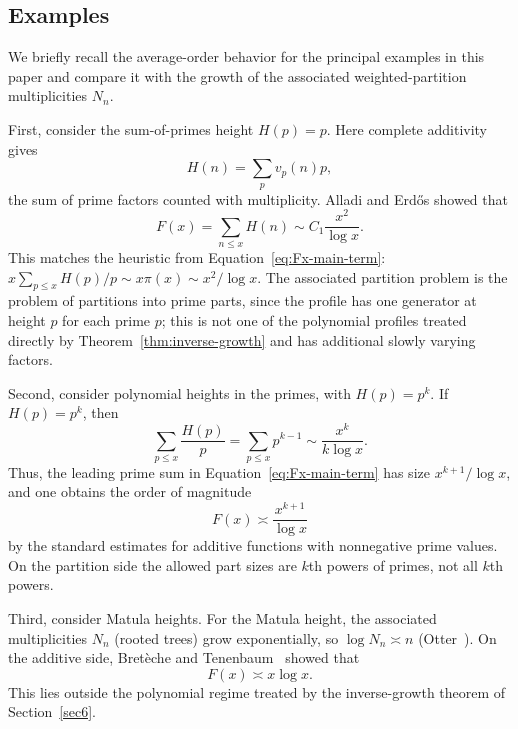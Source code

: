 \documentclass[11pt]{article}
\theoremstyle{definition}
\begin{document}
\subsection{Examples}

We briefly recall the average-order behavior for the principal examples in this paper and
compare it with the growth of the associated weighted-partition multiplicities $N_n$.

First, consider the sum-of-primes height $H(p)=p$.  Here complete additivity gives
\[
  H(n)=\sum_p v_p(n)p,
\]
the sum of prime factors counted with multiplicity.  Alladi and Erd\H{o}s showed
that
\[
  F(x)=\sum_{n\le x}H(n)\sim C_1\frac{x^2}{\log x}.
\]
This matches the heuristic from Equation~\eqref{eq:Fx-main-term}:
$x\sum_{p\le x}H(p)/p\sim x\pi(x)\sim x^2/\log x$.  The associated partition
problem is the problem of partitions into prime parts, since the profile has one
generator at height $p$ for each prime $p$; this is not one of the polynomial
profiles treated directly by Theorem~\ref{thm:inverse-growth} and has additional
slowly varying factors.

Second, consider polynomial heights in the primes, with $H(p)=p^k$.  If $H(p)=p^k$, then
\[
\sum_{p\le x}\frac{H(p)}p
=
\sum_{p\le x}p^{k-1}
\sim \frac{x^k}{k\log x}.
\]
Thus, the leading prime sum in Equation~\eqref{eq:Fx-main-term} has size
$x^{k+1}/\log x$, and one obtains the order of magnitude
\[
  F(x)\asymp \frac{x^{k+1}}{\log x}
\]
by the standard estimates for additive functions with nonnegative prime values.
On the partition side the allowed part sizes are $k$th powers of primes, not all
$k$th powers.

Third, consider Matula heights.  For the Matula height, the associated multiplicities $N_n$ (rooted trees) grow exponentially,
so $\log N_n\asymp n$ (Otter~\cite{otter}).  On the additive side,
Bret\`eche and Tenenbaum~\cite{breteche} showed that
\[
  F(x)\asymp x\log x.
\]
This lies outside the polynomial regime treated by the inverse-growth theorem of
Section~\ref{sec6}.
\end{document}

